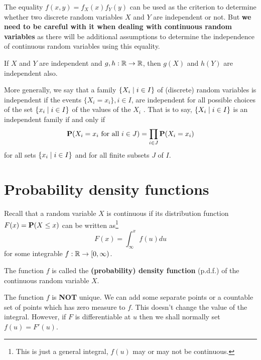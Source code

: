 \begin{remark}
The equality $f(x,y) = f_X(x) f_Y(y)$ can be used as the criterion to determine whether two discrete random variables $X$ and $Y$ are independent or not. But \textbf{we need to be careful with it when dealing with continuous random variables} as there will be additional assumptions to determine the independence of continuous random variables using this equality.
\end{remark}

\begin{theorem}
If $X$ and $Y$ are independent and $g, h: \mathbb{R} \to \mathbb{R}$, then $g(X)$ and $h(Y)$ are independent also. 
\end{theorem}

More generally, we say that a family $\{ X_i \;\vert\; i \in I\}$ of (discrete) random variables is independent if the events $\{X_i = x_i \}, i \in I$, are independent for all possible choices of the set $\{x_i \;\vert\; i \in I\}$ of the values of the $X_i$ . That is to say, $\{X_i \;\vert\; i \in I \}$ is an independent family if and only if 
\begin{equation*}
    \mathbf{P}(X_i = x_i \text{ for all }i\in J) = \prod_{i\in J} \mathbf{P}(X_i = x_i)
\end{equation*}
for all sets $\{x_i \;\vert\; i \in I\}$ and for all finite subsets $J$ of $I$.


\section{Probability density functions}
Recall that a random variable $X$ is continuous if its distribution function $F(x) = \mathbf{P}(X \leq x)$ can be written as\footnote{This is just a general integral, $f(u)$ may or may not be continuous.}
\begin{equation*}
    F(x) = \int_{\infty}^x f(u)du
\end{equation*}
for some integrable $f: \mathbb{R} \to [0, \infty)$.

\begin{definition}
The function $f$ is called the \textbf{(probability) density function} (p.d.f.) of the continuous random variable $X$. 
\end{definition}

\begin{remark}
The function $f$ is \textbf{NOT} unique. We can add some separate points or a countable set of points which has zero measure to $f$. This doesn't change the value of the integral. However, if $F$ is differentiable at $u$ then we shall normally set $f(u) = F'(u)$. 
\end{remark}

